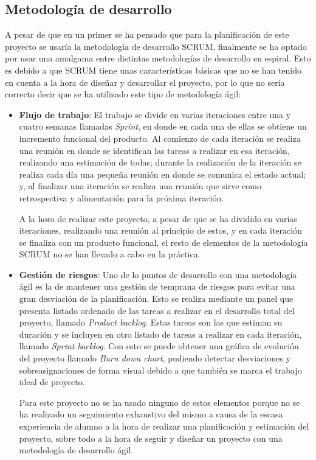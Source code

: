\subsection{Metodología de desarrollo}
\label{subsec:metodologia}

A pesar de que en un primer se ha pensado que para la planificación de este proyecto se usaría la metodología de desarrollo SCRUM\cite{Schwaber:2001:ASD:559553}\cite{Schwaber:2004:APM:984028}, finalmente se ha optado por usar una amalgama entre distintas metodologías de desarrollo en espiral. Esto es debido a que SCRUM tiene unas características básicas que no se han tenido en cuenta a la hora de diseñar y desarrollar el proyecto, por lo que no sería correcto decir que se ha utilizado este tipo de metodología ágil:

\begin{itemize}
	\item \textbf{Flujo de trabajo}: El trabajo se divide en varias iteraciones entre una y cuatro semanas llamadas \textit{Sprint}, en donde en cada una de ellas se obtiene un incremento funcional del producto. Al comienzo de cada iteración se realiza una reunión en donde se identifican las tareas a realizar en esa iteración, realizando una estimación de todas; durante la realización de la iteración se realiza cada día una pequeña reunión en donde se comunica el estado actual; y, al finalizar una iteración se realiza una reunión que sirve como retrospectiva y alimentación para la próxima iteración.
	
	A la hora de realizar este proyecto, a pesar de que se ha dividido en varias iteraciones, realizando una reunión al principio de estos, y en cada iteración se finaliza con un producto funcional, el resto de elementos de la metodología SCRUM no se han llevado a cabo en la práctica.
	
	\item \textbf{Gestión de riesgos}: Uno de lo puntos de desarrollo con una metodología ágil es la de mantener una gestión de temprana de riesgos para evitar una gran desviación de la planificación. Esto se realiza mediante un panel que presenta listado ordenado de las tareas a realizar en el desarrollo total del proyecto, llamado \textit{Product backlog}. Estas tareas son las que estiman su duración y se incluyen en otro listado de tareas a realizar en cada iteración, llamado \textit{Sprint backlog}. Con esto se puede obtener una gráfica de evolución del proyecto llamado \textit{Burn down chart}, pudiendo detectar desviaciones y sobreasignaciones de forma visual debido a que también se marca el trabajo ideal de proyecto.
	
	Para este proyecto no se ha usado ninguno de estos elementos porque no se ha realizado un seguimiento exhaustivo del mismo a causa de la escasa experiencia de alumno a la hora de realizar una planificación y estimación del proyecto, sobre todo a la hora de seguir y diseñar un proyecto con una metodología de desarrollo ágil.
\end{itemize}


